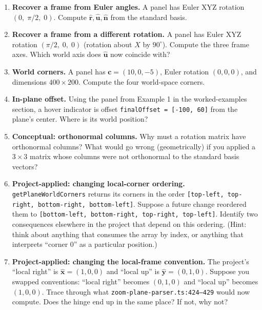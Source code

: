 \documentclass{article}
\begin{document}
\begin{enumerate}
    \item \textbf{Recover a frame from Euler angles.} A panel has Euler XYZ
          rotation $(0,\; \pi/2,\; 0)$. Compute $\hat{\mathbf{r}},
          \hat{\mathbf{u}}, \hat{\mathbf{n}}$ from the standard basis.

    \item \textbf{Recover a frame from a different rotation.} A panel has
          Euler XYZ rotation $(\pi/2,\; 0,\; 0)$ (rotation about $X$ by
          $90^\circ$). Compute the three frame axes. Which world axis does
          $\hat{\mathbf{u}}$ now coincide with?

    \item \textbf{World corners.} A panel has $\mathbf{c} = (10, 0, -5)$,
          Euler rotation $(0, 0, 0)$, and dimensions $400 \times 200$.
          Compute the four world-space corners.

    \item \textbf{In-plane offset.} Using the panel from Example 1 in the
          worked-examples section, a hover indicator is offset
          \verb|finalOffset = [-100, 60]| from the plane's center. Where is
          its world position?

    \item \textbf{Conceptual: orthonormal columns.} Why must a rotation
          matrix have orthonormal columns? What would go wrong (geometrically)
          if you applied a $3 \times 3$ matrix whose columns were not
          orthonormal to the standard basis vectors?

    \item \textbf{Project-applied: changing local-corner ordering.}
          \texttt{getPlaneWorldCorners} returns its corners in the order
          \texttt{[top-left, top-right, bottom-right, bottom-left]}. Suppose
          a future change reordered them to
          \texttt{[bottom-left, bottom-right, top-right, top-left]}.
          Identify two consequences elsewhere in the project that depend on
          this ordering. (Hint: think about anything that consumes the array
          by index, or anything that interprets ``corner 0'' as a particular
          position.)

    \item \textbf{Project-applied: changing the local-frame convention.}
          The project's ``local right'' is $\hat{\mathbf{x}} = (1,0,0)$ and
          ``local up'' is $\hat{\mathbf{y}} = (0,1,0)$. Suppose you swapped
          conventions: ``local right'' becomes $(0,1,0)$ and ``local up''
          becomes $(1,0,0)$. Trace through what
          \texttt{zoom-plane-parser.ts:424--429} would now compute. Does the
          hinge end up in the same place? If not, why not?
\end{enumerate}
\end{document}
